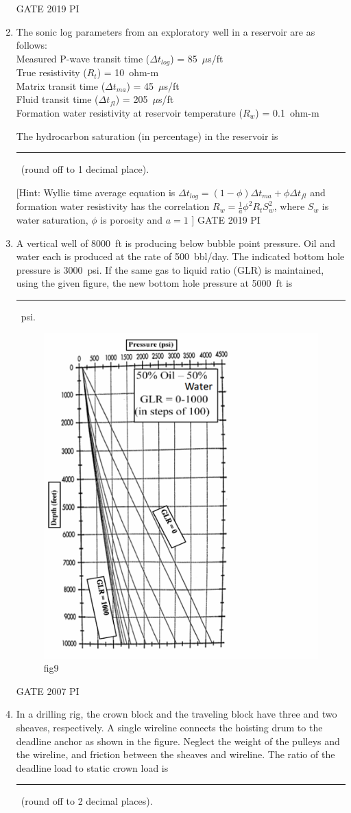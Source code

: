 \documentclass[journal,12pt,onecolumn]{IEEEtran}
\theoremstyle{remark}
\begin{document}
\begin{enumerate}
\hfill{GATE 2019 PI}
\item The sonic log parameters from an exploratory well in a reservoir are as follows: \\
Measured P-wave transit time ($\Delta t_{log}$) = 85~$\mu$s/ft \\
True resistivity ($R_t$) = 10~ohm-m \\
Matrix transit time ($\Delta t_{ma}$) = 45~$\mu$s/ft \\
Fluid transit time ($\Delta t_{fl}$) = 205~$\mu$s/ft \\
Formation water resistivity at reservoir temperature ($R_w$) = 0.1~ohm-m

The hydrocarbon saturation (in percentage) in the reservoir is \rule{2cm}{0.15mm}~(round off to 1 decimal place).

[Hint: Wyllie time average equation is $\Delta t_{log} = (1-\phi)\Delta t_{ma} + \phi \Delta t_{fl}$ and formation water resistivity has the correlation $R_w = \frac{1}{a} \phi^2 R_t S_w^2$, where $S_w$ is water saturation, $\phi$ is porosity and $a=1$ ]
\hfill{GATE 2019 PI}
\item A vertical well of 8000~ft is producing below bubble point pressure. Oil and water each is produced at the rate of 500~bbl/day. The indicated bottom hole pressure is 3000~psi. If the same gas to liquid ratio (GLR) is maintained, using the given figure, the new bottom hole pressure at 5000~ft is \rule{2.5cm}{0.15mm}~psi.
\begin{figure}[H]
    \centering
    \includegraphics[width=0.5\linewidth]{figs/Q.50.png}
    \caption{fig9}
    \label{fig:figs/Q.50.png}
\end{figure}
\hfill{GATE 2007 PI}
\item In a drilling rig, the crown block and the traveling block have three and two sheaves, respectively. A single wireline connects the hoisting drum to the deadline anchor as shown in the figure. Neglect the weight of the pulleys and the wireline, and friction between the sheaves and wireline. The ratio of the deadline load to static crown load is \rule{2cm}{0.15mm}~(round off to 2 decimal places).


\end{enumerate}
\end{document}
